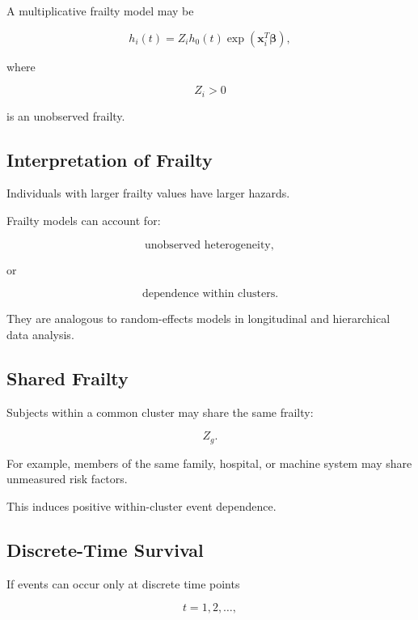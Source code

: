 A multiplicative frailty model may be

\[
\boxed{
h_i(t)
=
Z_i
h_0(t)
\exp
(
\mathbf{x}_i^T
\boldsymbol{\beta}
),
}
\]

where

\[
Z_i>0
\]

is an unobserved frailty.

\subsection{Interpretation of Frailty}
\label{subsec:frailty-interpretation}

Individuals with larger frailty values have larger hazards.

Frailty models can account for:

\[
\boxed{
\text{unobserved heterogeneity},
}
\]

or

\[
\boxed{
\text{dependence within clusters}.
}
\]

They are analogous to random-effects models in longitudinal and
hierarchical data analysis.

\subsection{Shared Frailty}
\label{subsec:shared-frailty}

Subjects within a common cluster may share the same frailty:

\[
\boxed{
Z_g.
}
\]

For example, members of the same family, hospital, or machine system may
share unmeasured risk factors.

This induces positive within-cluster event dependence.

\subsection{Discrete-Time Survival}
\label{subsec:discrete-time-survival}

If events can occur only at discrete time points

\[
t=1,2,\ldots,
\]

